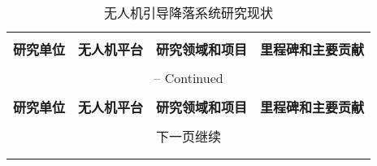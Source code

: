 \begin{landscape}
	\renewcommand{\thefootnote}{\fnsymbol{footnote}}
	\renewcommand{\arraystretch}{0.81}
	\scriptsize
	
	\begin{longtable}{m{5cm}m{5cm}m{5cm}m{5cm}}
		\caption{无人机引导降落系统研究现状}
		\label{table:All_UAV_Research} \\
		
		\hline \hline \\[-2ex]
		\multicolumn{1}{c}{\textbf{研究单位}} &
		\multicolumn{1}{c}{\textbf{无人机平台}} &
		\multicolumn{1}{c}{\textbf{研究领域和项目}} &
		\multicolumn{1}{c}{\textbf{里程碑和主要贡献}} \\[0.5ex]\hline \hline \\[-2ex]
		\endfirsthead
		
		
		\multicolumn{4}{c}{{\tablename} \thetable{} -- Continued}\\[0.5ex]
		\hline \hline \\[-2ex]
		\multicolumn{1}{c}{\textbf{研究单位}} &
		\multicolumn{1}{c}{\textbf{无人机平台}} &
		\multicolumn{1}{c}{\textbf{研究领域和项目}} &
		\multicolumn{1}{c}{\textbf{里程碑和主要贡献}} \\[0.5ex]\hline \\[-2ex]
		\endhead
		
		\multicolumn{4}{c}{{下一页继续}} \\
		\endfoot
		
		\hline\hline\\[-4.0ex] 
		\endlastfoot
		

\end{longtable}
\end{landscape}
